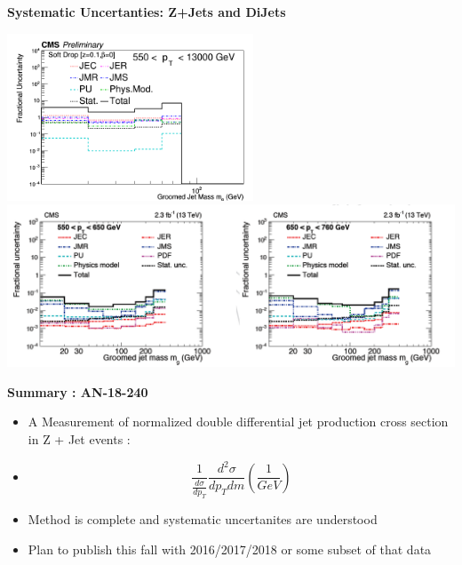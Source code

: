\documentclass{beamer}
\begin{document}
\begin{frame}{\textbf{Systematic Uncertanties: Z+Jets and DiJets}}


\includegraphics[width=0.55\textwidth]{Jun25_unfoldPlots_sdB0/AllSystematics_FractionofUnfoldedBinContent_ptbin6MC_mass_Ptbin550to13000_Detbinning_Groomingis_sdB0.png}%
\newline
\includegraphics[width=1\textwidth]{dijet550andup.png}
\newline


\end{frame}

\begin{frame}{\textbf{Summary : AN-18-240}}
\vspace{3.5mm}
\begin{itemize}
\item A Measurement of normalized double differential jet production cross section in Z + Jet events :
\item[] $$ \frac{1}{ \frac{d\sigma}{dp_{T}} }   \frac{d^2\sigma}{dp_{T} dm}  (\frac{1}{GeV})  $$

\item Method is complete and systematic uncertanites are understood
\item Plan to publish this fall with 2016/2017/2018 or some subset of that data




\end{itemize}
\end{frame}
\end{document}
